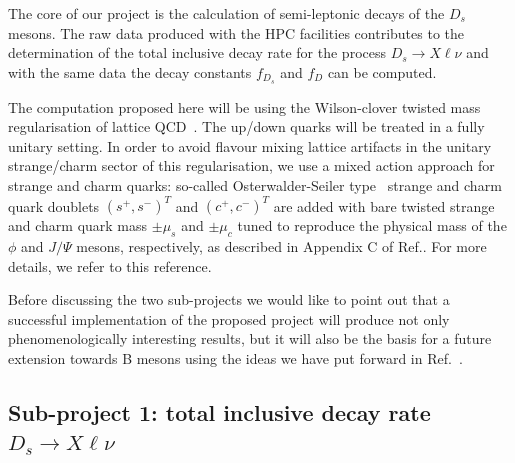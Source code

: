 \label{sec:proj}
The core of our project is the calculation of semi-leptonic decays of the $D_s$ mesons.
The raw data produced with the HPC facilities
contributes to the determination of 
the total inclusive decay rate for the process $D_s \to X\ell\nu$ and with the same 
data the decay constants $f_{D_s}$ and $f_D$ can be computed.

The computation proposed here will be using the Wilson-clover twisted
mass regularisation of lattice QCD~\cite{Alexandrou:2018egz}. The up/down quarks will be treated
in a fully unitary setting. In order to avoid flavour mixing lattice artifacts 
in the unitary strange/charm sector of this regularisation, we use a
mixed action approach for strange and charm quarks: so-called
Osterwalder-Seiler type~\cite{Frezzotti:2004wz} strange and charm quark doublets
$(s^+ , s^-)^T$ and $(c^+ , c^- )^T$ are added with bare
twisted strange and charm quark mass $\pm \mu_s$ and $\pm \mu_c$
tuned to reproduce the physical mass of the $\phi$ and $J/\Psi$
mesons, respectively, as described in Appendix C of
Ref.\cite{ExtendedTwistedMass:2022jpw}. For more details, we refer to
this reference.

Before discussing the two sub-projects we would like to point out that a
successful implementation of the proposed project will produce not
only phenomenologically interesting results, but it will also be the
basis for a future extension towards B mesons using the ideas we have
put forward in Ref.~\cite{ETM:2009sed}.

\subsection{Sub-project 1: total inclusive decay rate $D_s \to X\ell\nu$}

